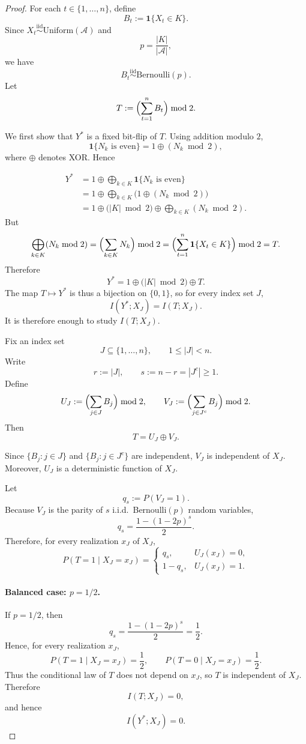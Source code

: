 \documentclass{article}
\theoremstyle{plain}
\theoremstyle{definition}
\theoremstyle{remark}
\begin{document}
\begin{proof}
For each \(t\in\{1,\ldots,n\}\), define
\[
B_t := \mathbf{1}\{X_t\in K\}.
\]
Since \(X_t \overset{\mathrm{iid}}{\sim} \mathrm{Uniform}(\mathcal A)\) and
\[
p = \frac{|K|}{|\mathcal A|},
\]
we have
\[
B_t \overset{\mathrm{iid}}{\sim} \mathrm{Bernoulli}(p).
\]
Let
\[
T := \Bigl(\sum_{t=1}^n B_t\Bigr)\bmod 2.
\]

We first show that \(Y^*\) is a fixed bit-flip of \(T\). Using addition modulo \(2\),
\[
\mathbf{1}\{N_k \text{ is even}\} = 1 \oplus (N_k \bmod 2),
\]
where \(\oplus\) denotes XOR. Hence

\begin{align*}
Y^*
&=
1 \oplus\bigoplus_{k\in K} \mathbf{1}\{N_k \text{ is even}\} \\
&=
1 \oplus\bigoplus_{k\in K} \bigl(1 \oplus (N_k \bmod 2)\bigr) \\
&=
1 \oplus\bigl(|K|\bmod 2\bigr)\oplus \bigoplus_{k\in K}(N_k \bmod 2).
\end{align*}
But
\[
\bigoplus_{k\in K}(N_k \bmod 2)
=
\Bigl(\sum_{k\in K} N_k\Bigr)\bmod 2
=
\Bigl(\sum_{t=1}^n \mathbf{1}\{X_t\in K\}\Bigr)\bmod 2
=
T.
\]
Therefore
\[
Y^* = 1 \oplus\bigl(|K|\bmod 2\bigr)\oplus T.
\]
The map \(T\mapsto Y^*\) is thus a bijection on \(\{0,1\}\), so for every index set \(J\),
\[
I(Y^*;X_J)=I(T;X_J).
\]
It is therefore enough to study \(I(T;X_J)\).

Fix an index set
\[
J\subseteq \{1,\ldots,n\},
\qquad 1\le |J|<n.
\]
Write
\[
r := |J|,
\qquad
s := n-r = |J^c| \ge 1.
\]
Define
\[
U_J := \Bigl(\sum_{j\in J} B_j\Bigr)\bmod 2,
\qquad
V_J := \Bigl(\sum_{j\in J^c} B_j\Bigr)\bmod 2.
\]
Then
\[
T = U_J \oplus V_J.
\]

Since \(\{B_j : j\in J\}\) and \(\{B_j : j\in J^c\}\) are independent,
\(V_J\) is independent of \(X_J\). Moreover, \(U_J\) is a deterministic function of
\(X_J\).

Let
\[
q_s := P(V_J=1).
\]
Because \(V_J\) is the parity of \(s\) i.i.d.\ Bernoulli\((p)\) random variables,
\[
q_s = \frac{1-(1-2p)^s}{2}.
\]
Therefore, for every realization \(x_J\) of \(X_J\),
\[
P(T=1\mid X_J=x_J)
=
\begin{cases}
q_s, & U_J(x_J)=0,\\
1-q_s, & U_J(x_J)=1.
\end{cases}
\]

\paragraph{Balanced case: \(p=1/2\).}
If \(p=1/2\), then
\[
q_s = \frac{1-(1-2p)^s}{2} = \frac{1}{2}.
\]
Hence, for every realization \(x_J\),
\[
P(T=1\mid X_J=x_J)=\frac12,
\qquad
P(T=0\mid X_J=x_J)=\frac12.
\]
Thus the conditional law of \(T\) does not depend on \(x_J\), so \(T\) is independent
of \(X_J\). Therefore
\[
I(T;X_J)=0,
\]
and hence
\[
I(Y^*;X_J)=0.
\]


\end{proof}
\end{document}
